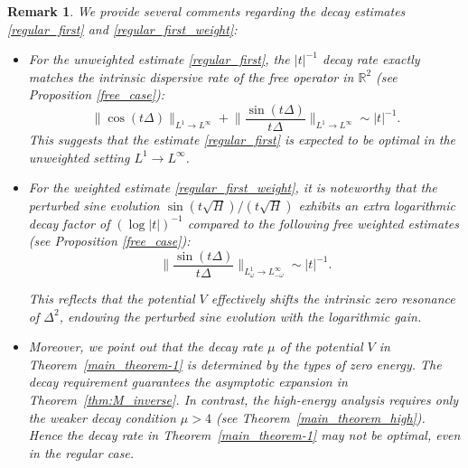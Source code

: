 \documentclass[reqno]{amsart}
\newtheorem{remark}[theorem]{Remark}
\numberwithin{equation}{section}
\begin{document}
\begin{remark}
{\rm
We provide several comments regarding the decay estimates \eqref{regular_first} and \eqref{regular_first_weight}:  
\begin{itemize}  
    \item  
    For the unweighted estimate \eqref{regular_first}, the $|t|^{-1}$ decay rate exactly matches the intrinsic dispersive rate of the free operator in $\mathbb{R}^2$ (see Proposition \ref{free_case}):   
    \[
\|\cos(t\Delta)\|_{L^1\to L^\infty} + \Big\|\frac{\sin(t\Delta)}{t\Delta}\Big\|_{L^1\to L^\infty} \sim |t|^{-1}.  
    \]
    This suggests that the estimate \eqref{regular_first} is expected to be optimal in the unweighted setting $L^1\to L^\infty$.

    \item    
    For the weighted estimate \eqref{regular_first_weight}, it is noteworthy that the perturbed sine evolution $\sin (t \sqrt{H})/(t\sqrt{H})$ exhibits an extra logarithmic decay factor of $(\log|t|)^{-1}$ compared to the following free weighted estimates (see Proposition \ref{free_case}):  
       \[\Big\|\frac{\sin(t\Delta)}{t\Delta}\Big\|_{L^1_\omega\to L^\infty_{-\omega}} \sim |t|^{-1}.   \]

This reflects that the potential $V$ effectively shifts the intrinsic zero resonance of  $\Delta^2$, endowing the  perturbed  sine evolution with the logarithmic gain.
  
\item  %
 Moreover, we point out that the decay rate $\mu$ of the potential $V$   in Theorem~\ref{main_theorem-1}  is determined by the types of zero energy. The decay requirement guarantees the
	asymptotic expansion  in Theorem~\ref{thm:M_inverse}.	In contrast, the high-energy analysis requires only the weaker decay
	condition $\mu>4$ (see Theorem~\ref{main_theorem_high}). Hence the decay rate in Theorem~\ref{main_theorem-1}  may not be optimal, even in the regular case.
    \end{itemize}}  
\end{remark}
\end{document}
